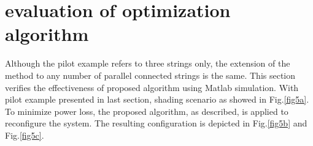 \documentclass[conference]{IEEEtran}
\begin{document}
\section{evaluation of optimization algorithm}
Although the pilot example refers to three strings only, the extension of the method to any number of parallel connected strings is the same.
This section verifies the effectiveness of proposed algorithm using Matlab simulation. With pilot example presented in last section, shading scenario as showed in Fig.\ref{fig5a}. To minimize power loss, the proposed algorithm, as described, is applied to reconfigure the system. The resulting configuration is depicted in Fig.\ref{fig5b} and Fig.\ref{fig5c}. 
\end{document}
